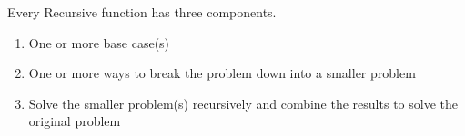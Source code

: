 \begin{blocksection}
Every Recursive function has three components.

\begin{enumerate}
\item One or more base case(s)
\item One or more ways to break the problem down into a smaller problem
\item Solve the smaller problem(s) recursively and combine the results to solve the original problem
\end{enumerate}
\end{blocksection}
